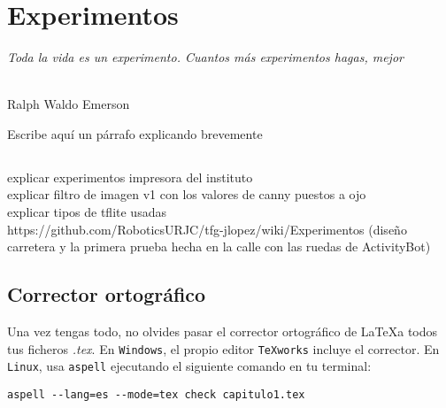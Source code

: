 \chapter{Experimentos}
\label{cap:capitulo7}

\begin{flushright}
\begin{minipage}[]{10cm}
\emph{Toda la vida es un experimento. Cuantos más experimentos hagas, mejor}\\
\end{minipage}\\

Ralph Waldo Emerson\\
\end{flushright}

\vspace{1cm}

Escribe aquí un párrafo explicando brevemente 

\section{}

explicar experimentos impresora del instituto \\

explicar filtro de imagen v1 con los valores de canny puestos a ojo\\

explicar tipos de tflite usadas \\


https://github.com/RoboticsURJC/tfg-jlopez/wiki/Experimentos (diseño carretera y la primera prueba hecha en la calle con las ruedas de ActivityBot)


\section{Corrector ortográfico}

Una vez tengas todo, no olvides pasar el corrector ortográfico de \LaTeX a todos tus ficheros \textit{.tex}. En \texttt{Windows}, el propio editor \texttt{TeXworks} incluye el corrector. En \texttt{Linux}, usa \texttt{aspell} ejecutando el siguiente comando en tu terminal:

\begin{verbatim}
aspell --lang=es --mode=tex check capitulo1.tex
\end{verbatim}
